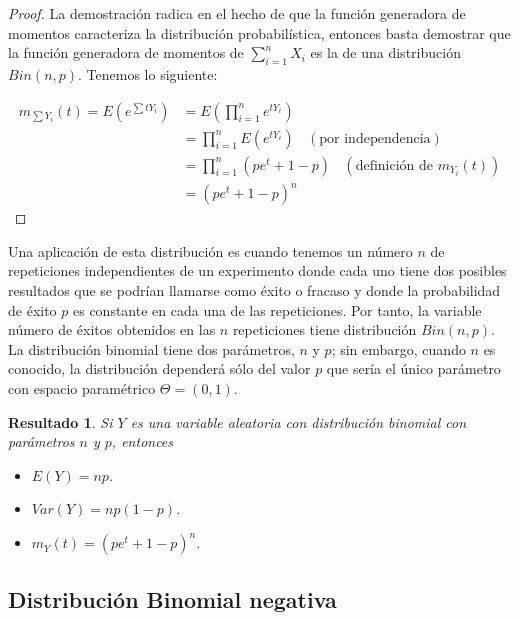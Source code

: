 \documentclass[
  spanish,
]{book}
\providecommand{\tightlist}{%
  \setlength{\itemsep}{0pt}\setlength{\parskip}{0pt}}
\newtheorem{proposition}{Resultado}[chapter]
\theoremstyle{definition}
\theoremstyle{definition}
\theoremstyle{definition}
\theoremstyle{definition}
\theoremstyle{remark}
\begin{document}
\begin{proof}
\iffalse{} {Prueba. } \fi{}La demostración radica en el hecho de que la función generadora de momentos caracteriza la distribución probabilística, entonces basta demostrar que la función generadora de momentos de \(\sum_{i=1}^nX_i\) es la de una distribución \(Bin(n,p)\). Tenemos lo siguiente:

\begin{align*}
m_{\sum Y_i}(t)=E(e^{\sum tY_i})&=E(\prod_{i=1}^ne^{tY_i})\\
               &=\prod_{i=1}^nE(e^{tY_i})\ \ \ \ (\text{por independencia})\\
               &=\prod_{i=1}^n(pe^t+1-p)\ \ \ \ (\text{definición de $m_{Y_i}(t)$})\\
               &=(pe^t+1-p)^n
\end{align*}
\end{proof}

Una aplicación de esta distribución es cuando tenemos un número \(n\) de repeticiones independientes de un experimento donde cada uno tiene dos
posibles resultados que se podrían llamarse como éxito o fracaso y donde la probabilidad de éxito \(p\) es constante en cada una de las repeticiones. Por tanto, la variable número de éxitos obtenidos en las \(n\) repeticiones tiene distribución \(Bin(n,p)\). La distribución binomial tiene dos parámetros, \(n\) y \(p\); sin embargo, cuando \(n\) es conocido, la distribución dependerá sólo del valor \(p\) que sería el único parámetro con espacio paramétrico \(\Theta=(0,1)\).

\begin{proposition}
\protect\hypertarget{prp:unnamed-chunk-10}{}{\label{prp:unnamed-chunk-10} }Si \(Y\) es una variable aleatoria con distribución binomial con parámetros \(n\) y \(p\), entonces

\begin{itemize}
\tightlist
\item
  \(E(Y)=np\).
\item
  \(Var(Y)=np(1-p)\).
\item
  \(m_Y(t)=(pe^t+1-p)^n\).
\end{itemize}
\end{proposition}

\hypertarget{distribuciuxf3n-binomial-negativa}{%
\subsection{Distribución Binomial negativa}\label{distribuciuxf3n-binomial-negativa}}
\end{document}
